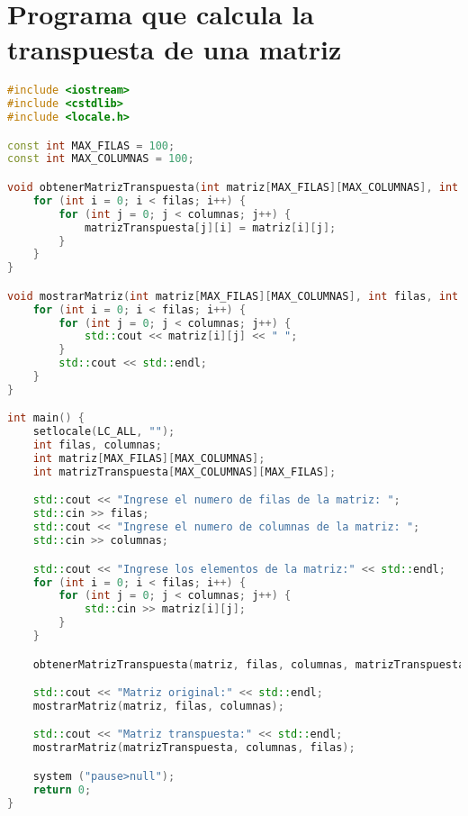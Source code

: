 
\section*{Programa que calcula la transpuesta de una matriz}

\noindent
\begin{lstlisting}[language=C++]
#include <iostream>
#include <cstdlib>
#include <locale.h>

const int MAX_FILAS = 100;
const int MAX_COLUMNAS = 100;

void obtenerMatrizTranspuesta(int matriz[MAX_FILAS][MAX_COLUMNAS], int filas, int columnas, int matrizTranspuesta[MAX_COLUMNAS][MAX_FILAS]) {
    for (int i = 0; i < filas; i++) {
        for (int j = 0; j < columnas; j++) {
            matrizTranspuesta[j][i] = matriz[i][j];
        }
    }
}

void mostrarMatriz(int matriz[MAX_FILAS][MAX_COLUMNAS], int filas, int columnas) {
    for (int i = 0; i < filas; i++) {
        for (int j = 0; j < columnas; j++) {
            std::cout << matriz[i][j] << " ";
        }
        std::cout << std::endl;
    }
}

int main() {
    setlocale(LC_ALL, "");
    int filas, columnas;
    int matriz[MAX_FILAS][MAX_COLUMNAS];
    int matrizTranspuesta[MAX_COLUMNAS][MAX_FILAS];

    std::cout << "Ingrese el numero de filas de la matriz: ";
    std::cin >> filas;
    std::cout << "Ingrese el numero de columnas de la matriz: ";
    std::cin >> columnas;

    std::cout << "Ingrese los elementos de la matriz:" << std::endl;
    for (int i = 0; i < filas; i++) {
        for (int j = 0; j < columnas; j++) {
            std::cin >> matriz[i][j];
        }
    }

    obtenerMatrizTranspuesta(matriz, filas, columnas, matrizTranspuesta);

    std::cout << "Matriz original:" << std::endl;
    mostrarMatriz(matriz, filas, columnas);

    std::cout << "Matriz transpuesta:" << std::endl;
    mostrarMatriz(matrizTranspuesta, columnas, filas);

	system ("pause>null");
	return 0;
}

\end{lstlisting}